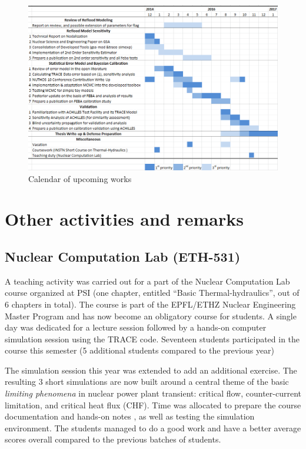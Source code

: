 \documentclass[11pt,titlepage]{article}
\begin{document}
\begin{figure}[h!]
	\centering
	\includegraphics[scale=0.60]{figures/calendar.png}
	\caption{Calendar of upcoming works}
	\label{fig:calendar}
\end{figure}

\section{Other activities and remarks}

\subsection{Nuclear Computation Lab (ETH-531)}

A teaching activity was carried out for a part of the Nuclear Computation Lab 
course organized at PSI (one chapter, entitled ``Basic Thermal-hydraulics'', out of 
6 chapters in total). 
The course is part of the EPFL/ETHZ Nuclear Engineering Master Program and has 
now become an obligatory course for students.
A single day was dedicated for a lecture session followed by a hands-on computer
simulation session using the TRACE code.
Seventeen students participated in the course this semester (5 additional students 
compared to the previous year)

The simulation session this year was extended to add an additional exercise.
The resulting 3 short simulations are now built around a central theme of 
the basic \emph{limiting phenomena} in nuclear power plant transient: 
critical flow, counter-current limitation, and critical heat flux (CHF).
Time was allocated to prepare the course documentation and hands-on notes 
\cite{Wicaksono2015c}, as well as testing the simulation environment.
The students managed to do a good work and have a better average 
scores overall compared to the previous batches of students. 
\end{document}
